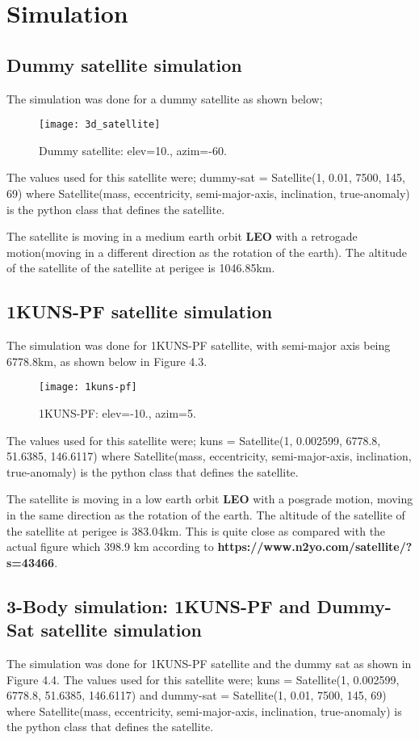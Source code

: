 \section{Simulation}
\subsection{Dummy satellite simulation}
The simulation was done for a dummy satellite as shown below;
\begin{figure}[h]
	\centering
	\texttt{[image: 3d\_satellite]}
	\caption{Dummy satellite: elev=10., azim=-60.}
	\label{fig:dummy-satellite}
\end{figure}

The values used for this satellite were; dummy-sat = Satellite(1, 0.01, 7500, 145, 69)   where Satellite(mass, eccentricity, semi-major-axis, inclination, true-anomaly) is the python class that defines the satellite.

The satellite is moving in a medium earth orbit \textbf{LEO} with a retrogade motion\big(moving in a different direction as the rotation of the earth). The altitude of the satellite of the satellite at perigee is 1046.85km.

\subsection{1KUNS-PF satellite simulation}
The simulation was done for 1KUNS-PF satellite, with semi-major axis being 6778.8km, as shown below in Figure 4.3.
\begin{figure}[h]
	\centering
	\texttt{[image: 1kuns-pf]}
	\caption{1KUNS-PF: elev=-10., azim=5.}
	\label{fig:1KUNS-PF}
\end{figure}

The values used for this satellite were; kuns = Satellite(1, 0.002599, 6778.8, 51.6385, 146.6117)   where Satellite(mass, eccentricity, semi-major-axis, inclination, true-anomaly) is the python class that defines the satellite.

The satellite is moving in a low earth orbit \textbf{LEO} with a posgrade motion, moving in the same direction as the rotation of the earth. The altitude of the satellite of the satellite at perigee is 383.04km. This is quite close as compared with the actual figure which 398.9 km according to 
\textbf{https://www.n2yo.com/satellite/?s=43466}.
\subsection{3-Body simulation: 1KUNS-PF and Dummy-Sat satellite simulation}
The simulation was done for 1KUNS-PF satellite and the dummy sat as shown in Figure 4.4. The values used for this satellite were; kuns = Satellite(1, 0.002599, 6778.8, 51.6385, 146.6117)  and dummy-sat = Satellite(1, 0.01, 7500, 145, 69) where Satellite(mass, eccentricity, semi-major-axis, inclination, true-anomaly) is the python class that defines the satellite.

